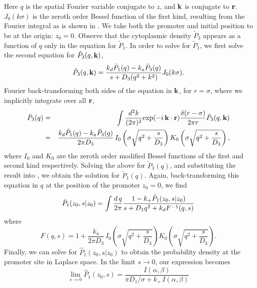 Here $q$ is the spatial Fourier variable conjugate to $z$, and ${\bf k}$ is conjugate to ${\bf r}$. $J_0(k\sigma)$ is the zeroth order Bessel function of the first kind, resulting from the Fourier integral as is shown in . We take both the promoter and initial position to be at the origin: $z_0 = 0$. Observe that the cytoplasmic density $\tilde{P}_3$ appears as a function of $q$ only in the equation for $\tilde{P}_1$. In order to solve for $\tilde{P}_1$, we first solve the second equation for $\tilde{P}_3(q,{\bf k})$, 
\begin{equation}
 \tilde{P}_3(q,{\bf k}) = \frac{k_d \tilde{P}_1(q) - k_a\tilde{P}_3(q)}{s + D_3(q^2 + k^2)} J_{0}(k \sigma ).
\end{equation}
Fourier back-transforming both sides of the equation in ${\bf k}$, for $r=\sigma$, where we implicitly integrate over all ${\bf r}$,
\begin{eqnarray}
 \elabel{FourierBackC}
 \tilde{P}_3(q) & = & \int \frac{d^2 k}{(2 \pi)^2} {\rm exp}(-i\,{\bf k}\cdot{\bf r}) \frac{\delta(r-\sigma)}{2\pi r} \tilde{P}_3(q,{\bf k}) \\
 & = & \frac{k_d \tilde{P}_1(q) - k_a\tilde{P}_3(q)}{2 \pi D_3} \, I_{0}\left( \sigma \sqrt{q^2 + \frac{s}{D_3}} \right) K_{0}\left( \sigma \sqrt{q^2 + \frac{s}{D_3}} \right),
\end{eqnarray}
where $I_0$ and $K_0$ are the zeroth order modified Bessel functions of the first and second kind respectively. Solving the above for $\tilde{P}_3(q)$, and substituting the result into , we obtain the solution for $\tilde{P}_1(q)$. Again, back-transforming this equation in $q$ at the position of the promoter $z_0=0$, we find
\begin{equation}
 \hat{P}_1(z_0,s|z_0) = \int \frac{d\,q}{2 \pi} \frac{1 - k_+ \hat{P}_1(z_0,s|z_0)}{s + D_1 q^2+k_d F^{-1}(q,s)}
 \elabel{FDE_dna2}
\end{equation}
where
\begin{equation}
F(q,s) = 1 + \frac{k_a}{2 \pi D_3} \, I_{0}\left( \sigma \sqrt{q^2 + \frac{s}{D_3}} \right) K_{0}\left( \sigma \sqrt{q^2 + \frac{s}{D_3}} \right).
\end{equation}
Finally, we can solve  for $\hat{P}_1(z_0, s|z_0)$ to obtain the probability density at the promoter site in Laplace space. In the limit $s \to 0$, our expression becomes
\begin{equation}
 \lim_{s \to 0} \hat{P}_1(z_0, s) = \frac{I(\alpha,\beta)}{\pi D_1 / \sigma + k_+ \, I(\alpha,\beta)}
\end{equation}
